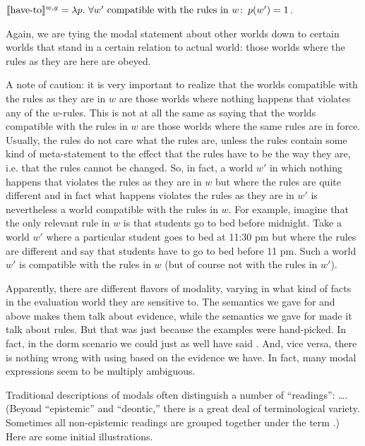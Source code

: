 \ex $\sv{\mbox{have-to}}^{w,g} = \lambda p.\ \forall w' \mbox{ compatible with
  the rules in } w\co p(w') = 1$. \xe

Again, we are tying the modal statement about other worlds down to
certain worlds that stand in a certain relation to actual world: those
worlds where the rules as they are here are obeyed.

A note of caution: it is very important to realize that the worlds
compatible with the rules as they are in $w$ are those worlds where
nothing happens that violates any of the $w$-rules. This is not at all
the same as saying that the worlds compatible with the rules in $w$
are those worlds where the same rules are in force. Usually, the rules
do not care what the rules are, unless the rules contain some kind of
meta-statement to the effect that the rules have to be the way they
are, i.e. that the rules cannot be changed. So, in fact, a world $w'$
in which nothing happens that violates the rules as they are in $w$
but where the rules are quite different and in fact what happens
violates the rules as they are in $w'$ is nevertheless a world
compatible with the rules in $w$. For example, imagine that the only
relevant rule in $w$ is that students go to bed before midnight. Take
a world $w'$ where a particular student goes to bed at 11:30 pm but
where the rules are different and say that students have to go to bed
before 11 pm. Such a world $w'$ is compatible with the rules in $w$
(but of course not with the rules in $w'$).

Apparently, there are different flavors of modality, varying in what
kind of facts in the evaluation world they are sensitive to. The
semantics we gave for  and  above
makes them talk about evidence, while the semantics we gave for
 made it talk about rules. But that was just
because the examples were hand-picked. In fact, in the dorm scenario
we could just as well have said . And,
vice versa, there is nothing wrong with using  based on the evidence we have. In fact, many
modal expressions seem to be multiply ambiguous.

Traditional descriptions of modals often distinguish a number of
``readings'':  \dots. (Beyond ``epistemic'' and ``deontic,'' there is a
great deal of terminological variety. Sometimes all non-epistemic
readings are grouped together under the term .)
Here are some initial illustrations.

